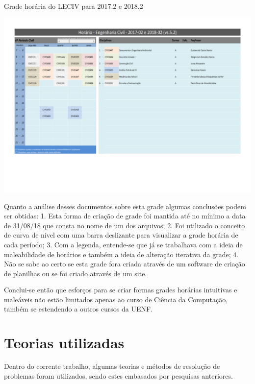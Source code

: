 \begin{CenteredFigure} \caption{Grade horária do LECIV para 2017.2 e 2018.2} \label{fig:LECIV}
  \includegraphics[width=\textwidth]{files/img/2.02!2-marco/GradeHoráriaLECIV}
\end{CenteredFigure}

Quanto a análise desses documentos sobre esta grade algumas conclusões podem ser obtidas: 1. Esta forma de criação de grade foi mantida até no mínimo a data de 31/08/18 que consta no nome de um dos arquivos; 2. Foi utilizado o conceito de curva de nível com uma barra deslizante para visualizar a grade horária de cada período; 3. Com a legenda, entende-se que já se trabalhava com a ideia de maleabilidade de horários e também a ideia de alteração iterativa da grade; 4. Não se sabe ao certo se esta grade fora criada através de um software de criação de planilhas ou se foi criado através de um site.

Conclui-se então que esforços para se criar formas grades horárias intuitivas e maleáveis não estão limitados apenas ao curso de Ciência da Computação, também se estendendo a outros cursos da UENF.

\section{Teorias utilizadas} \label{sec:teorias}                                                          %

Dentro do corrente trabalho, algumas teorias e métodos de resolução de problemas foram utilizados, sendo estes embasados por pesquisas anteriores.

